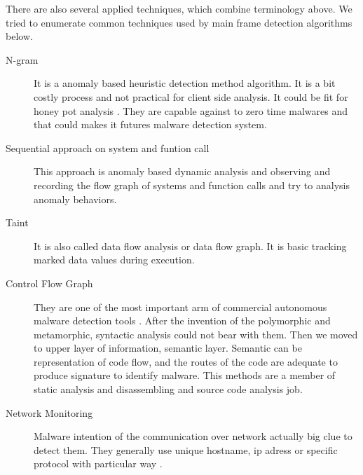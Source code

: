There are also several applied techniques, which combine terminology above. We tried to enumerate common techniques used by main frame detection algorithms below.
\begin{description}
\item[N-gram] It is a anomaly  based heuristic detection method algorithm. It is a bit costly process and not practical for client side analysis. It could be fit for honey pot analysis \cite{reddy2006n} \cite{abou2004n} \cite{abou2004detection}. They are capable against to zero time malwares and that could makes it futures malware detection system. 
\item[Sequential approach on system and funtion call] This approach is anomaly based dynamic analysis and observing and recording the flow graph of systems and function calls and  try to analysis anomaly behaviors.\cite{kendall2007practical}
\item[Taint] It is also called data flow analysis or data flow graph. It is basic tracking marked data values during execution.\cite{saxena2008efficient}\cite{saxena2008efficient}\cite{smith2007principles}
\item[Control Flow Graph] They are one of the most important arm of commercial autonomous malware detection tools\cite{lee2010detecting} \cite{christodorescu2006static} \cite{christodorescu2005semantics}. After the invention of the polymorphic and metamorphic, syntactic analysis could not bear with them. Then we moved to upper layer of information, semantic layer. Semantic can be representation of code flow, and the routes of the code are adequate to produce signature to identify malware. This methods are a member of static analysis and disassembling and source code analysis job.
\item[Network Monitoring] Malware intention of the communication over network actually big clue to detect them. They generally use unique hostname, ip adress or specific protocol with particular way \cite{marpaung2012survey}.
\end{description}